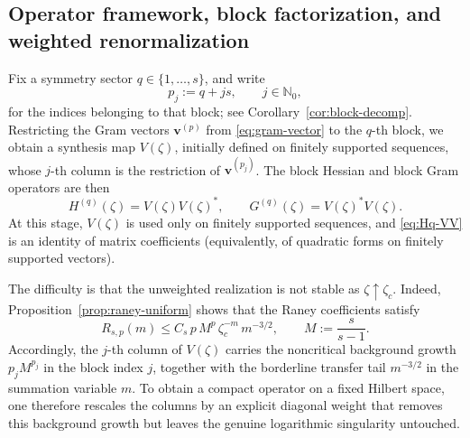 \documentclass[11pt]{amsart}
\numberwithin{equation}{section}
\theoremstyle{plain}
\theoremstyle{definition}
\theoremstyle{remark}
\newcommand{\NN}{\mathbb{N}}
\begin{document}
\subsection{Operator framework, block factorization, and weighted renormalization}
\label{subsec:gram-operators}

Fix a symmetry sector \(q\in\{1,\dots,s\}\), and write
\[
	p_j:=q+js,\qquad j\in\NN_0,
\]
for the indices belonging to that block; see
Corollary~\ref{cor:block-decomp}. Restricting the Gram vectors
\(\bm v^{(p)}\) from \eqref{eq:gram-vector} to the \(q\)-th block, we obtain
a synthesis map \(V(\zeta)\), initially defined on finitely supported
sequences, whose \(j\)-th column is the restriction of
\(\bm v^{(p_j)}\). The block Hessian and block Gram operators are then
\begin{equation}\label{eq:Hq-VV}
	H^{(q)}(\zeta)=V(\zeta)V(\zeta)^*,
	\qquad
	G^{(q)}(\zeta)=V(\zeta)^*V(\zeta).
\end{equation}
At this stage, \(V(\zeta)\) is used only on finitely supported sequences, and
\eqref{eq:Hq-VV} is an identity of matrix coefficients (equivalently, of
quadratic forms on finitely supported vectors).

The difficulty is that the unweighted realization is not stable as
\(\zeta\uparrow\zeta_c\). Indeed, Proposition~\ref{prop:raney-uniform}
shows that the Raney coefficients satisfy
\[
	R_{s,p}(m)\le C_s\,p\,M^{p}\,\zeta_c^{-m}\,m^{-3/2},
	\qquad
	M:=\frac{s}{s-1}.
\]
Accordingly, the \(j\)-th column of \(V(\zeta)\) carries the noncritical
background growth \(p_jM^{p_j}\) in the block index \(j\), together with the
borderline transfer tail \(m^{-3/2}\) in the summation variable \(m\). To
obtain a compact operator on a fixed Hilbert space, one therefore rescales
the columns by an explicit diagonal weight that removes this background
growth but leaves the genuine logarithmic singularity untouched.
\end{document}

